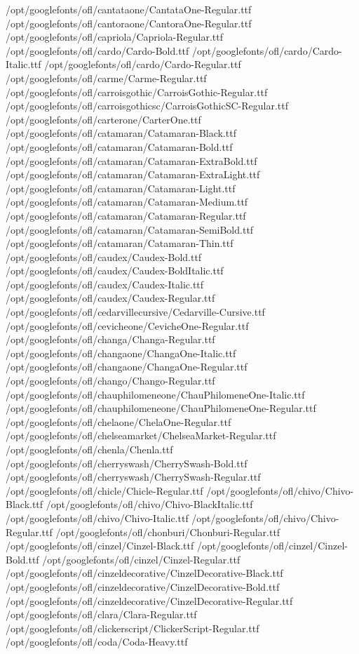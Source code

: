 /opt/googlefonts/ofl/cantataone/CantataOne-Regular.ttf
/opt/googlefonts/ofl/cantoraone/CantoraOne-Regular.ttf
/opt/googlefonts/ofl/capriola/Capriola-Regular.ttf
/opt/googlefonts/ofl/cardo/Cardo-Bold.ttf
/opt/googlefonts/ofl/cardo/Cardo-Italic.ttf
/opt/googlefonts/ofl/cardo/Cardo-Regular.ttf
/opt/googlefonts/ofl/carme/Carme-Regular.ttf
/opt/googlefonts/ofl/carroisgothic/CarroisGothic-Regular.ttf
/opt/googlefonts/ofl/carroisgothicsc/CarroisGothicSC-Regular.ttf
/opt/googlefonts/ofl/carterone/CarterOne.ttf
/opt/googlefonts/ofl/catamaran/Catamaran-Black.ttf
/opt/googlefonts/ofl/catamaran/Catamaran-Bold.ttf
/opt/googlefonts/ofl/catamaran/Catamaran-ExtraBold.ttf
/opt/googlefonts/ofl/catamaran/Catamaran-ExtraLight.ttf
/opt/googlefonts/ofl/catamaran/Catamaran-Light.ttf
/opt/googlefonts/ofl/catamaran/Catamaran-Medium.ttf
/opt/googlefonts/ofl/catamaran/Catamaran-Regular.ttf
/opt/googlefonts/ofl/catamaran/Catamaran-SemiBold.ttf
/opt/googlefonts/ofl/catamaran/Catamaran-Thin.ttf
/opt/googlefonts/ofl/caudex/Caudex-Bold.ttf
/opt/googlefonts/ofl/caudex/Caudex-BoldItalic.ttf
/opt/googlefonts/ofl/caudex/Caudex-Italic.ttf
/opt/googlefonts/ofl/caudex/Caudex-Regular.ttf
/opt/googlefonts/ofl/cedarvillecursive/Cedarville-Cursive.ttf
/opt/googlefonts/ofl/cevicheone/CevicheOne-Regular.ttf
/opt/googlefonts/ofl/changa/Changa-Regular.ttf
/opt/googlefonts/ofl/changaone/ChangaOne-Italic.ttf
/opt/googlefonts/ofl/changaone/ChangaOne-Regular.ttf
/opt/googlefonts/ofl/chango/Chango-Regular.ttf
/opt/googlefonts/ofl/chauphilomeneone/ChauPhilomeneOne-Italic.ttf
/opt/googlefonts/ofl/chauphilomeneone/ChauPhilomeneOne-Regular.ttf
/opt/googlefonts/ofl/chelaone/ChelaOne-Regular.ttf
/opt/googlefonts/ofl/chelseamarket/ChelseaMarket-Regular.ttf
/opt/googlefonts/ofl/chenla/Chenla.ttf
/opt/googlefonts/ofl/cherryswash/CherrySwash-Bold.ttf
/opt/googlefonts/ofl/cherryswash/CherrySwash-Regular.ttf
/opt/googlefonts/ofl/chicle/Chicle-Regular.ttf
/opt/googlefonts/ofl/chivo/Chivo-Black.ttf
/opt/googlefonts/ofl/chivo/Chivo-BlackItalic.ttf
/opt/googlefonts/ofl/chivo/Chivo-Italic.ttf
/opt/googlefonts/ofl/chivo/Chivo-Regular.ttf
/opt/googlefonts/ofl/chonburi/Chonburi-Regular.ttf
/opt/googlefonts/ofl/cinzel/Cinzel-Black.ttf
/opt/googlefonts/ofl/cinzel/Cinzel-Bold.ttf
/opt/googlefonts/ofl/cinzel/Cinzel-Regular.ttf
/opt/googlefonts/ofl/cinzeldecorative/CinzelDecorative-Black.ttf
/opt/googlefonts/ofl/cinzeldecorative/CinzelDecorative-Bold.ttf
/opt/googlefonts/ofl/cinzeldecorative/CinzelDecorative-Regular.ttf
/opt/googlefonts/ofl/clara/Clara-Regular.ttf
/opt/googlefonts/ofl/clickerscript/ClickerScript-Regular.ttf
/opt/googlefonts/ofl/coda/Coda-Heavy.ttf
